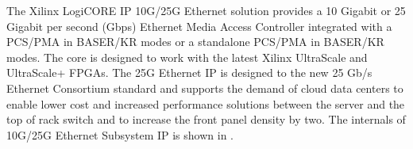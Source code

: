 The Xilinx LogiCORE IP 10G/25G Ethernet solution provides a 10 Gigabit or 25 Gigabit per second (Gbps) Ethernet Media Access Controller integrated with a PCS/PMA in BASE\textendash R/KR modes or a standalone PCS/PMA in BASE\textendash R/KR modes. The core is designed to work with the latest Xilinx UltraScale and UltraScale+ FPGAs. The 25G Ethernet IP is designed to the new 25 Gb/s Ethernet Consortium standard and supports the demand of cloud data centers to enable lower cost and increased performance solutions between the server and the top of rack switch and to increase the front panel density by two. The internals of 10G/25G Ethernet Subsystem IP is shown in .

\pagebreak

